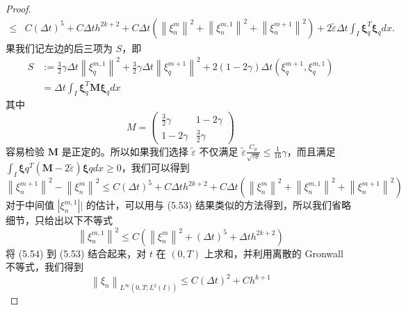\begin{proof}
\begin{equation}
\begin{aligned}
            \leq & C(\Delta t)^{5}+C \Delta t h^{2 k+2}+C \Delta t\left(\left\|\xi_{n}^{m}\right\|^{2}+\left\|\xi_{n}^{m, 1}\right\|^{2}+\left\|\xi_{n}^{m+1}\right\|^{2}\right)+2 \tilde{\varepsilon} \Delta t \int_{I} \boldsymbol{\xi}_{q}^{T} \boldsymbol{\xi}_{q} d x .
        \end{aligned}
    \end{equation}
    果我们记左边的后三项为 $S$，即
    $$
        \begin{aligned}
            S & :=\frac{3}{2} \gamma \Delta t\left\|\xi_{q}^{m, 1}\right\|^{2}+\frac{3}{2} \gamma \Delta t\left\|\xi_{q}^{m+1}\right\|^{2}+2(1-2 \gamma) \Delta t\left(\xi_{q}^{m+1}, \xi_{q}^{m, 1}\right) \\
              & =\Delta t \int_{I} \boldsymbol{\xi}_{q}^{T} \boldsymbol{M} \boldsymbol{\xi}_{q} d x
        \end{aligned}
    $$
    其中
    $$
        M=\left(\begin{array}{cc}
                \frac{3}{2} \gamma & 1-2 \gamma         \\
                1-2 \gamma         & \frac{3}{2} \gamma
            \end{array}\right)
    $$
    容易检验 $\boldsymbol{M}$ 是正定的。所以如果我们选择 $\tilde{\varepsilon}$ 不仅满足 $\tilde{\varepsilon} \frac{C_{\mu}}{\sqrt{\tau \theta}} \leq \frac{1}{16} \gamma$，而且满足 $\int_{I} \boldsymbol{\xi}{q}^{T}(\boldsymbol{M}-2 \tilde{\varepsilon}) \boldsymbol{\xi}{q} d x \geq 0$，我们可以得到
    \begin{equation}
        \left\|\xi_{n}^{m+1}\right\|^{2}-\left\|\xi_{n}^{m}\right\|^{2} \leq C(\Delta t)^{5}+C \Delta t h^{2 k+2}+C \Delta t\left(\left\|\xi_{n}^{m}\right\|^{2}+\left\|\xi_{n}^{m, 1}\right\|^{2}+\left\|\xi_{n}^{m+1}\right\|^{2}\right)
    \end{equation}
    对于中间值 $| \xi_{n}^{m, 1}||$ 的估计，可以用与 (5.53) 结果类似的方法得到，所以我们省略细节，只给出以下不等式
    \begin{equation}
        \left\|\xi_{n}^{m, 1}\right\|^{2} \leq C\left(\left\|\xi_{n}^{m}\right\|^{2}+(\Delta t)^{5}+\Delta t h^{2 k+2}\right)
    \end{equation}
    将 (5.54) 到 (5.53) 结合起来，对 $t$ 在 $(0, T)$ 上求和，并利用离散的 Gronwall 不等式，我们得到
    \begin{equation}
        \left\|\xi_{n}\right\|_{L^{\infty}\left(0, T ; L^{2}(I)\right)} \leq C(\Delta t)^{2}+C h^{k+1}
    \end{equation}
\end{proof}
